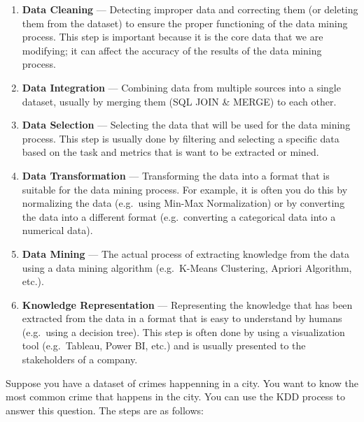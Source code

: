 \documentclass[
  11pt, %
]{assignment}
\begin{document}
\begin{enumerate}
	\item \textbf{Data Cleaning} --- Detecting improper data and correcting them (or deleting them from the dataset) to ensure the proper functioning of the data mining process. This step is important because it is the core data that we are modifying; it can affect the accuracy of the results of the data mining process.
	\item \textbf{Data Integration} --- Combining data from multiple sources into a single dataset, usually by merging them (SQL JOIN \& MERGE) to each other.
	\item \textbf{Data Selection} --- Selecting the data that will be used for the data mining process. This step is usually done by filtering and selecting a specific data based on the task and metrics that is want to be extracted or mined.
	\item \textbf{Data Transformation} --- Transforming the data into a format that is suitable for the data mining process. For example, it is often you do this by normalizing the data (e.g.\ using Min-Max Normalization) or by converting the data into a different format (e.g.\ converting a categorical data into a numerical data).
	\item \textbf{Data Mining} --- The actual process of extracting knowledge from the data using a data mining algorithm (e.g.\ K-Means Clustering, Apriori Algorithm, etc.).
	\item \textbf{Knowledge Representation} --- Representing the knowledge that has been extracted from the data in a format that is easy to understand by humans (e.g.\ using a decision tree). This step is often done by using a visualization tool (e.g.\ Tableau, Power BI, etc.) and is usually presented to the stakeholders of a company.
\end{enumerate}

Suppose you have a dataset of crimes happenning in a city. You want to know the most common crime that happens in the city. You can use the KDD process to answer this question. The steps are as follows:
\end{document}
